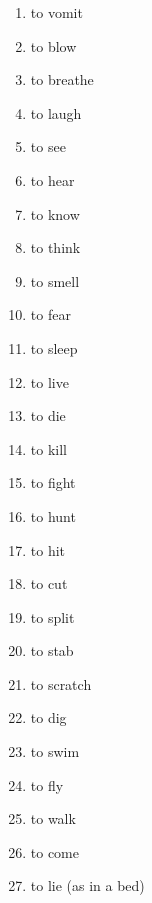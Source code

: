 \begin{multicols}{2}
\begin{enumerate}
\item   to vomit 

\item   to blow 

\item   to breathe 

\item   to laugh 

\item   to see 

\item   to hear 

\item   to know 

\item   to think 

\item   to smell 

\item   to fear 

\item   to sleep 

\item   to live 

\item   to die 

\item   to kill 

\item   to fight 

\item   to hunt 

\item   to hit 

\item   to cut 

\item   to split 

\item   to stab 

\item   to scratch 

\item   to dig 

\item   to swim 

\item   to fly 

\item   to walk 

\item   to come 

\item   to lie (as in a bed) 


\end{enumerate}
\end{multicols}
